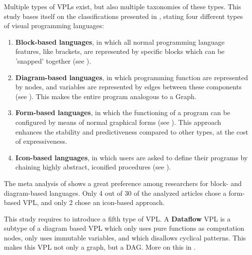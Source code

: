 Multiple types of \ac{VPL}s exist, but also multiple taxonomies of these types.
This study bases itself on the classifications presented in \citet{kuhail_characterizing_2021}, stating four different types of visual programming languages: 
\begin{enumerate}
  \item \textbf{Block-based languages}, in which all normal programming language \\ features, like brackets, are represented by specific blocks which can be 'snapped' together (see ).
  \item \textbf{Diagram-based languages}, in which programming function are represented by nodes, and variables are represented by edges between these components (see ). This makes the entire program analogous to a Graph.
  \item \textbf{Form-based languages}, in which the functioning of a program can be configured by means of normal graphical forms (see ). 
  This approach enhances the stability and predictiveness compared to other types, at the cost of expressiveness.
  \item \textbf{Icon-based languages}, in which users are asked to define their programs by chaining highly abstract, iconified procedures (see ). 
\end{enumerate}

The meta analysis of \cite{kuhail_characterizing_2021} shows a great preference among researchers for block- and diagram-based languages. 
Only 4 out of 30 of the analyzed articles chose a form-based VPL, and only 2 chose an icon-based approach.  

This study requires to introduce a fifth type of VPL. 
A \textbf{Dataflow} VPL is a subtype of a diagram based VPL which only uses pure functions as computation nodes, only uses immutable variables, and which disallows cyclical patterns. This makes this VPL not only a graph, but a \ac{DAG}.
More on this in .

